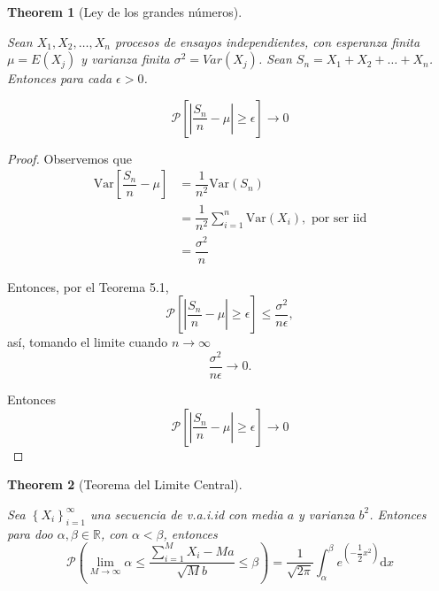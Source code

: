 \documentclass[
  letterpaper,
  DIV=11,
  numbers=noendperiod]{scrreprt}
\theoremstyle{plain}
\newtheorem{theorem}{Theorem}[chapter]
\theoremstyle{definition}
\theoremstyle{remark}
\begin{document}
\begin{theorem}[Ley de los grandes
números]\protect\hypertarget{thm-5.2}{}\label{thm-5.2}

Sean \(X_{1},X_{2},\dots, X_{n}\) procesos de ensayos independientes,
con esperanza finita \(\mu=E(X_{j})\) y varianza finita
\(\sigma^{2}=Var(X_{j})\). Sean \(S_{n}=X_{1}+X_{2}+\ldots+X_{n}\).
Entonces para cada \(\epsilon>0\).

\[
\mathcal{P}\left[\left|\dfrac{S_{n}}{n}-\mu\right|\geq\epsilon\right]\to0
\]

\end{theorem}

\begin{proof}

Observemos que \[
\begin{align*}
\text{Var}\left[\dfrac{S_{n}}{n}-\mu\right] & =\dfrac{1}{n^{2}}\text{Var}\left(S_{n}\right)\\
& =\dfrac{1}{n^{2}}\sum_{i=1}^{n}\text{Var}\left(X_{i}\right),\text{ por ser iid}\\
& =\dfrac{\sigma^{2}}{n}
\end{align*}
\]

Entonces, por el Teorema 5.1, \[
\mathcal{P}\left[\left|\dfrac{S_{n}}{n}-\mu\right|\geq\epsilon\right]\leq\dfrac{\sigma^{2}}{n\epsilon},
\] así, tomando el limite cuando \(n\to\infty\) \[
\dfrac{\sigma^{2}}{n\epsilon}\to0.
\]

Entonces \[
\mathcal{P}\left[\left|\dfrac{S_{n}}{n}-\mu\right|\geq\epsilon\right]\to0
\]

\end{proof}

\begin{theorem}[Teorema del Limite
Central]\protect\hypertarget{thm-5.3}{}\label{thm-5.3}

Sea \(\left\{ X_{i}\right\} _{i=1}^{\infty}\) una secuencia de v.a.i.id
con media \(a\) y varianza \(b^{2}\). Entonces para doo
\(\alpha,\beta\in\mathbb{R}\), con \(\alpha<\beta\), entonces \[
\mathcal{P}\left(\lim_{M\to\infty}\alpha\le\dfrac{{\displaystyle \sum_{i=1}^{M}}X_{i}-Ma}{\sqrt{M}b}\leq\beta\right)=\dfrac{1}{\sqrt{2\pi}}\int_{\alpha}^{\beta}e^{\left(-\dfrac{1}{2}x^{2}\right)}\mathrm{d}x
\]

\end{theorem}
\end{document}
